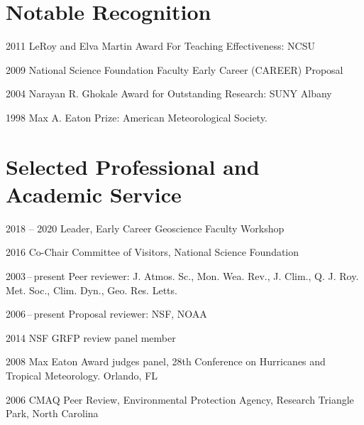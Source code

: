
\section*{Notable Recognition}

\begin{tlist}

\item[2011] LeRoy and Elva Martin Award For Teaching Effectiveness: NCSU
\item[2009] National Science Foundation Faculty Early Career (CAREER) Proposal
\item[2004] Narayan R. Ghokale Award for Outstanding Research: SUNY Albany
\item[1998] Max A. Eaton Prize: American Meteorological Society.

\end{tlist}



\section*{Selected Professional and Academic Service}

\begin{tlist}
\item[2018 -- 2020] Leader, Early Career Geoscience Faculty Workshop 
\item[2016] Co-Chair Committee of Visitors, National Science Foundation
\item[2003\,--\,present] Peer reviewer: J. Atmos. Sc., Mon. Wea. Rev., J. Clim., Q. J. Roy. Met. Soc., Clim. Dyn., Geo. Res. Letts.
\item[2006\,--\,present] Proposal reviewer: NSF, NOAA
\item[2014] NSF GRFP review panel member
\item[2008] Max Eaton Award judges panel, 28th Conference on Hurricanes and Tropical Meteorology. Orlando, FL
\item[2006] CMAQ Peer Review, Environmental Protection Agency, Research Triangle Park, North Carolina
\end{tlist}


